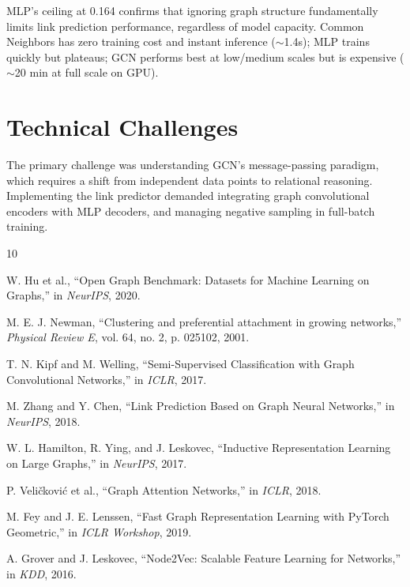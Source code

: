 \documentclass[12pt,a4paper]{article}
\begin{document}
MLP's ceiling at 0.164 confirms that ignoring graph structure fundamentally limits link prediction performance, regardless of model capacity. Common Neighbors has zero training cost and instant inference ($\sim$1.4s); MLP trains quickly but plateaus; GCN performs best at low/medium scales but is expensive ($\sim$20 min at full scale on GPU).

\section{Technical Challenges}

The primary challenge was understanding GCN's message-passing paradigm, which requires a shift from independent data points to relational reasoning. Implementing the link predictor demanded integrating graph convolutional encoders with MLP decoders, and managing negative sampling in full-batch training.

\begin{thebibliography}{10}

W. Hu et al., ``Open Graph Benchmark: Datasets for Machine Learning on Graphs,''
in \textit{NeurIPS}, 2020.

M. E. J. Newman, ``Clustering and preferential attachment in growing networks,''
\textit{Physical Review E}, vol. 64, no. 2, p. 025102, 2001.

T. N. Kipf and M. Welling, ``Semi-Supervised Classification with Graph Convolutional Networks,''
in \textit{ICLR}, 2017.

M. Zhang and Y. Chen, ``Link Prediction Based on Graph Neural Networks,''
in \textit{NeurIPS}, 2018.

W. L. Hamilton, R. Ying, and J. Leskovec, ``Inductive Representation Learning on Large Graphs,''
in \textit{NeurIPS}, 2017.

P. Veličković et al., ``Graph Attention Networks,''
in \textit{ICLR}, 2018.

M. Fey and J. E. Lenssen, ``Fast Graph Representation Learning with PyTorch Geometric,''
in \textit{ICLR Workshop}, 2019.

A. Grover and J. Leskovec, ``Node2Vec: Scalable Feature Learning for Networks,''
in \textit{KDD}, 2016.

\end{thebibliography}
\end{document}
